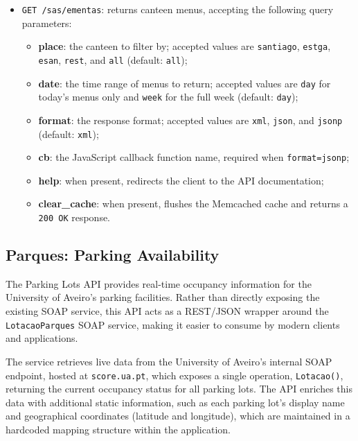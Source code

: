 \documentclass[12pt, a4paper]{report}
\begin{document}
\begin{itemize}
      \item \texttt{GET /sas/ementas}: returns canteen menus, accepting the following
          query parameters:
    \begin{itemize}
        \item \textbf{place}: the canteen to filter by; accepted values are
              \texttt{santiago}, \texttt{estga}, \texttt{esan}, \texttt{rest}, and
              \texttt{all} (default: \texttt{all});
        \item \textbf{date}: the time range of menus to return; accepted values are
              \texttt{day} for today's menus only and \texttt{week} for the full week
              (default: \texttt{day});
        \item \textbf{format}: the response format; accepted values are \texttt{xml},
              \texttt{json}, and \texttt{jsonp} (default: \texttt{xml});
        \item \textbf{cb}: the JavaScript callback function name, required when
              \texttt{format=jsonp};
        \item \textbf{help}: when present, redirects the client to the API documentation;
        \item \textbf{clear\_cache}: when present, flushes the Memcached cache and
              returns a \texttt{200 OK} response.
    \end{itemize}
\end{itemize}

\subsection{Parques: Parking Availability}
The Parking Lots API provides real-time occupancy information for the University of Aveiro's
parking facilities. Rather than directly exposing the existing SOAP service, this API acts as
a REST/JSON wrapper around the \texttt{LotacaoParques} SOAP service, making it easier to
consume by modern clients and applications.

The service retrieves live data from the University of Aveiro's internal SOAP endpoint,
hosted at \texttt{score.ua.pt}, which exposes a single operation, \texttt{Lotacao()},
returning the current occupancy status for all parking lots. The API enriches this data
with additional static information, such as each parking lot's display name and geographical
coordinates (latitude and longitude), which are maintained in a hardcoded mapping structure
within the application.
\end{document}
